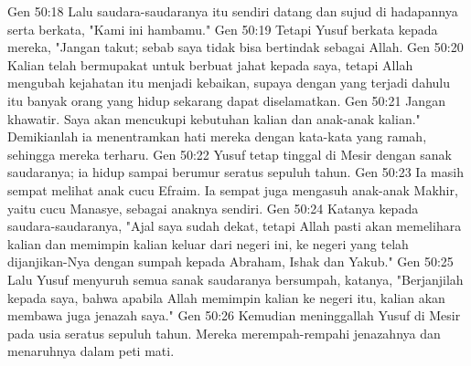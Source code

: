 Gen 50:18  Lalu saudara-saudaranya itu sendiri datang dan sujud di hadapannya serta berkata, "Kami ini hambamu."
Gen 50:19  Tetapi Yusuf berkata kepada mereka, "Jangan takut; sebab saya tidak bisa bertindak sebagai Allah.
Gen 50:20  Kalian telah bermupakat untuk berbuat jahat kepada saya, tetapi Allah mengubah kejahatan itu menjadi kebaikan, supaya dengan yang terjadi dahulu itu banyak orang yang hidup sekarang dapat diselamatkan.
Gen 50:21  Jangan khawatir. Saya akan mencukupi kebutuhan kalian dan anak-anak kalian." Demikianlah ia menentramkan hati mereka dengan kata-kata yang ramah, sehingga mereka terharu.
Gen 50:22  Yusuf tetap tinggal di Mesir dengan sanak saudaranya; ia hidup sampai berumur seratus sepuluh tahun.
Gen 50:23  Ia masih sempat melihat anak cucu Efraim. Ia sempat juga mengasuh anak-anak Makhir, yaitu cucu Manasye, sebagai anaknya sendiri.
Gen 50:24  Katanya kepada saudara-saudaranya, "Ajal saya sudah dekat, tetapi Allah pasti akan memelihara kalian dan memimpin kalian keluar dari negeri ini, ke negeri yang telah dijanjikan-Nya dengan sumpah kepada Abraham, Ishak dan Yakub."
Gen 50:25  Lalu Yusuf menyuruh semua sanak saudaranya bersumpah, katanya, "Berjanjilah kepada saya, bahwa apabila Allah memimpin kalian ke negeri itu, kalian akan membawa juga jenazah saya."
Gen 50:26  Kemudian meninggallah Yusuf di Mesir pada usia seratus sepuluh tahun. Mereka merempah-rempahi jenazahnya dan menaruhnya dalam peti mati.


